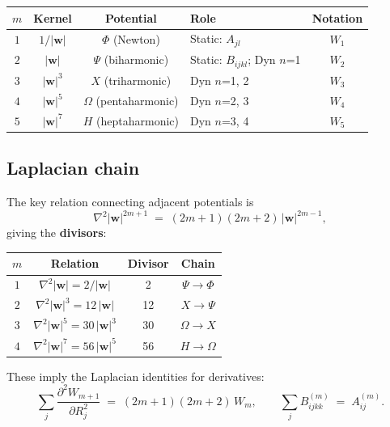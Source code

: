 \documentclass[11pt,a4paper]{article}
\newcommand{\bw}{\bm{w}}
\theoremstyle{plain}
\theoremstyle{remark}
\begin{document}
\begin{center}
\begin{tabular}{ccclc}
\toprule
$m$ & Kernel & Potential & Role & Notation \\
\midrule
$1$ & $1/|\bw|$   & $\Phi$ (Newton)       & Static: $A_{jl}$           & $W_1$ \\
$2$ & $|\bw|$     & $\Psi$ (biharmonic)    & Static: $B_{ijkl}$; Dyn $n$=1 & $W_2$ \\
$3$ & $|\bw|^3$   & $X$ (triharmonic)      & Dyn $n$=1, 2              & $W_3$ \\
$4$ & $|\bw|^5$   & $\Omega$ (pentaharmonic) & Dyn $n$=2, 3            & $W_4$ \\
$5$ & $|\bw|^7$   & $H$ (heptaharmonic)    & Dyn $n$=3, 4              & $W_5$ \\
\bottomrule
\end{tabular}
\end{center}

\subsection{Laplacian chain}

The key relation connecting adjacent potentials is
\begin{equation}
  \nabla^2 |\bw|^{2m+1}
  \;=\; (2m+1)(2m+2)\,|\bw|^{2m-1},
  \label{eq:laplacian-chain}
\end{equation}
giving the \textbf{divisors}:

\begin{center}
\begin{tabular}{cccc}
\toprule
$m$ & Relation & Divisor & Chain \\
\midrule
$1$ & $\nabla^2|\bw| = 2/|\bw|$ & 2 & $\Psi \to \Phi$ \\
$2$ & $\nabla^2|\bw|^3 = 12\,|\bw|$ & 12 & $X \to \Psi$ \\
$3$ & $\nabla^2|\bw|^5 = 30\,|\bw|^3$ & 30 & $\Omega \to X$ \\
$4$ & $\nabla^2|\bw|^7 = 56\,|\bw|^5$ & 56 & $H \to \Omega$ \\
\bottomrule
\end{tabular}
\end{center}

These imply the Laplacian identities for derivatives:
\begin{equation}
  \sum_j \frac{\partial^2 W_{m+1}}{\partial R_j^2}
  \;=\; (2m+1)(2m+2)\,W_m,
  \qquad
  \sum_j B^{(m)}_{ijkk} \;=\; A^{(m)}_{ij}.
  \label{eq:laplacian-identity}
\end{equation}
\end{document}
